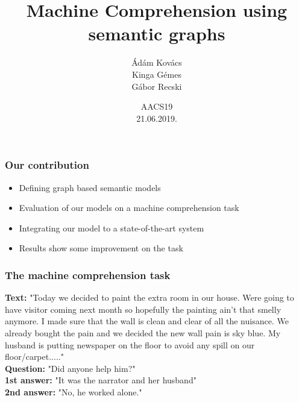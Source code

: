 \documentclass[bigger]{beamer}
\begin{document}
\title{Machine Comprehension using semantic graphs}
\author{\'Ad\'am Kov\'acs \\ Kinga G\'emes \\ G\'abor Recski}

\date{AACS19\\21.06.2019.}


\begin{frame} 

\titlepage 

\end{frame} 


\begin{frame} 

    \frametitle{Our contribution} 
    \begin{itemize}
        \pause \item Defining graph based semantic models
        \pause \item Evaluation of our models on a machine comprehension task
        \pause \item Integrating our model to a state-of-the-art system
        \pause \item Results show some improvement on the task
    \end{itemize}

\end{frame} 

\begin{frame}
	\frametitle{The machine comprehension task \citep{Chen:2018, Wang:2018}}
	\textbf{Text:} "Today we decided to paint the extra room in our house. Were going to have visitor coming next month so hopefully the painting ain't that smelly anymore. I made sure that the wall is clean and clear of all the nuisance. We already bought the pain and we decided the new wall pain is sky blue. My husband is putting newspaper on the floor to avoid any spill on our floor/carpet....." \\
	\textbf{Question:} "Did anyone help him?" \\
	\textbf{1st answer:} "It was the narrator and her husband" \\
	\textbf{2nd answer:} "No, he worked alone."
\end{frame}

\end{document}
